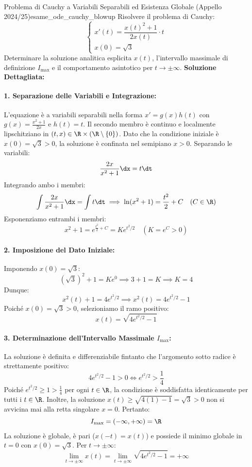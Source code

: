 \begin{esempio}{Problema di Cauchy a Variabili Separabili ed Esistenza Globale (Appello 2024/25)}{esame_ode_cauchy_blowup}
Risolvere il problema di Cauchy:
\[
    \begin{cases}
        x'(t) = \dfrac{x(t)^2 + 1}{2x(t)} \cdot t \\
        x(0) = \sqrt{3}
    \end{cases}
\]
Determinare la soluzione analitica esplicita $x(t)$, l'intervallo massimale di definizione $I_{\max}$ e il comportamento asintotico per $t \to \pm\infty$.
\tcblower
\textbf{Soluzione Dettagliata:}

\paragraph{1. Separazione delle Variabili e Integrazione:}
L'equazione è a variabili separabili nella forma $x' = g(x)h(t)$ con $g(x) = \frac{x^2+1}{2x}$ e $h(t) = t$.
Il secondo membro è continuo e localmente lipschitziano in $(t, x) \in \R \times (\R \setminus \{0\})$.
Dato che la condizione iniziale è $x(0) = \sqrt{3} > 0$, la soluzione è confinata nel semipiano $x > 0$.
Separando le variabili:
\[
    \frac{2x}{x^2 + 1} \dx = t \dt
\]
Integrando ambo i membri:
\[
    \int \frac{2x}{x^2 + 1} \dx = \int t \dt \implies \ln(x^2 + 1) = \frac{t^2}{2} + C \quad (C \in \R)
\]
Esponenziamo entrambi i membri:
\[
    x^2 + 1 = e^{\frac{t^2}{2} + C} = K e^{t^2/2} \quad (K = e^C > 0)
\]

\paragraph{2. Imposizione del Dato Iniziale:}
Imponendo $x(0) = \sqrt{3}$:
\[
    (\sqrt{3})^2 + 1 = K e^0 \implies 3 + 1 = K \implies K = 4
\]
Dunque:
\[
    x^2(t) + 1 = 4e^{t^2/2} \implies x^2(t) = 4e^{t^2/2} - 1
\]
Poiché $x(0) = \sqrt{3} > 0$, selezioniamo il ramo positivo:
\[
    x(t) = \sqrt{4e^{t^2/2} - 1}
\]

\paragraph{3. Determinazione dell'Intervallo Massimale $I_{\max}$:}
La soluzione è definita e differenziabile fintanto che l'argomento sotto radice è strettamente positivo:
\[
    4e^{t^2/2} - 1 > 0 \iff e^{t^2/2} > \frac{1}{4}
\]
Poiché $e^{t^2/2} \ge 1 > \frac{1}{4}$ per ogni $t \in \R$, la condizione è soddisfatta identicamente per tutti i $t \in \R$.
Inoltre, la soluzione $x(t) \ge \sqrt{4(1) - 1} = \sqrt{3} > 0$ non si avvicina mai alla retta singolare $x = 0$.
Pertanto:
\[
    I_{\max} = (-\infty, +\infty) = \R
\]
La soluzione è globale, è pari ($x(-t) = x(t)$) e possiede il minimo globale in $t = 0$ con $x(0) = \sqrt{3}$.
Per $t \to \pm \infty$:
\[
    \lim_{t \to \pm \infty} x(t) = \lim_{t \to \pm \infty} \sqrt{4e^{t^2/2} - 1} = +\infty
\]
\end{esempio}

